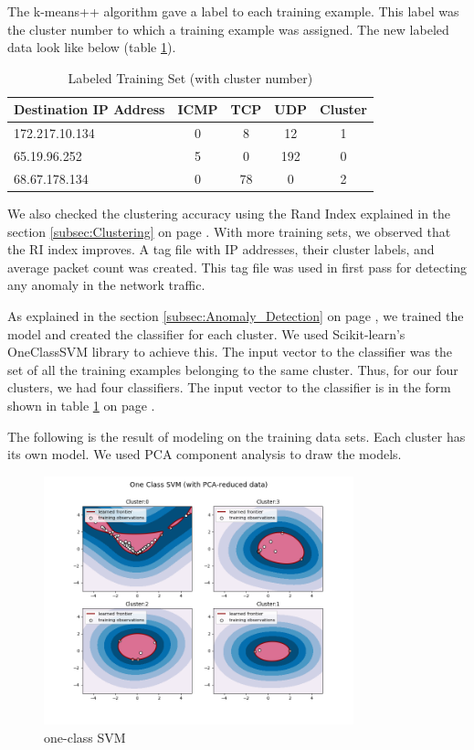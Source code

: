\documentclass[12pt,oneside,a4paper]{article}
\begin{document}
The k-means++ algorithm gave a label to each training example. This label was the cluster number to which a training example was assigned. The new labeled data look like below (table \ref{table:labeled-set}).

\begin{table}[H]
\centering
  \begin{tabular}{| l | c | c | c | c |}
    \hline
    {Destination IP Address}  &ICMP  &TCP &UDP  &Cluster \\
    \hline
    172.217.10.134  & 0     & 8     & 12  &1  \\ \hline
    65.19.96.252    & 5     & 0     & 192 &0  \\ \hline
    68.67.178.134   & 0     & 78    & 0   &2  \\ \hline
  \end{tabular}
\caption{Labeled Training Set (with cluster number)} \label{table:labeled-set}
\end{table}

We also checked the clustering accuracy using the Rand Index explained in the section \ref{subsec:Clustering} on page \pageref{subsec:Clustering}. With more training sets, we observed that the RI index improves. A tag file with IP addresses, their cluster labels, and average packet count was created. This tag file was used in first pass for detecting any anomaly in the network traffic.

As explained in the section \ref{subsec:Anomaly_Detection} on page \pageref{subsec:Anomaly_Detection}, we trained the model and created the classifier for each cluster. We used Scikit-learn's OneClassSVM library to achieve this. The input vector to the classifier was the set of all the training examples belonging to the same cluster. Thus, for our four clusters, we had four classifiers. The input vector to the classifier is in the form shown in table \ref{table:labeled-set} on page \pageref{table:labeled-set}.

The following is the result of modeling on the training data sets. Each cluster has its own model. We used PCA component analysis to draw the models.

\begin{figure}[H]
\centering
\includegraphics[width=0.80\textwidth]{one-class-SVM.png}
\caption{one-class SVM} \label{fig:one-class-SVM}
\end{figure}
\end{document}
